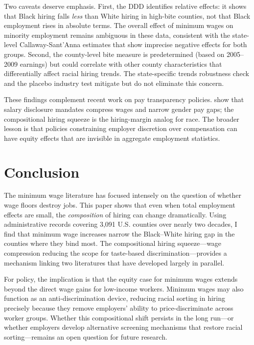 \documentclass[12pt]{article}
\begin{document}
Two caveats deserve emphasis. First, the DDD identifies relative effects: it shows that Black hiring falls \textit{less} than White hiring in high-bite counties, not that Black employment rises in absolute terms. The overall effect of minimum wages on minority employment remains ambiguous in these data, consistent with the state-level Callaway-Sant'Anna estimates that show imprecise negative effects for both groups. Second, the county-level bite measure is predetermined (based on 2005--2009 earnings) but could correlate with other county characteristics that differentially affect racial hiring trends. The state-specific trends robustness check and the placebo industry test mitigate but do not eliminate this concern.

These findings complement recent work on pay transparency policies. \citet{cullen2024equilibrium} show that salary disclosure mandates compress wages and narrow gender pay gaps; the compositional hiring squeeze is the hiring-margin analog for race. The broader lesson is that policies constraining employer discretion over compensation can have equity effects that are invisible in aggregate employment statistics.


\section{Conclusion}

The minimum wage literature has focused intensely on the question of whether wage floors destroy jobs. This paper shows that even when total employment effects are small, the \textit{composition} of hiring can change dramatically. Using administrative records covering 3,091 U.S. counties over nearly two decades, I find that minimum wage increases narrow the Black--White hiring gap in the counties where they bind most. The compositional hiring squeeze---wage compression reducing the scope for taste-based discrimination---provides a mechanism linking two literatures that have developed largely in parallel.

For policy, the implication is that the equity case for minimum wages extends beyond the direct wage gains for low-income workers. Minimum wages may also function as an anti-discrimination device, reducing racial sorting in hiring precisely because they remove employers' ability to price-discriminate across worker groups. Whether this compositional shift persists in the long run---or whether employers develop alternative screening mechanisms that restore racial sorting---remains an open question for future research.
\end{document}
